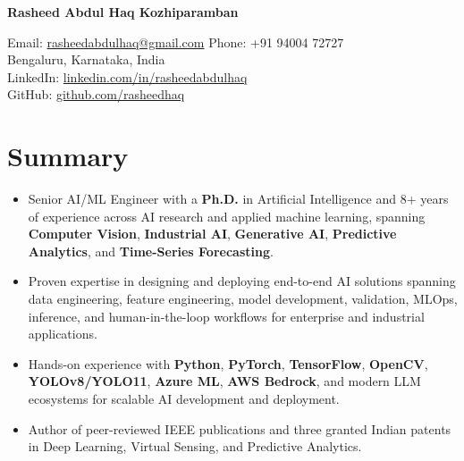 \documentclass[a4paper,10pt]{article}
\begin{document}
	\pagestyle{empty}
	
	\begin{center}
		{\Huge\bfseries Rasheed Abdul Haq Kozhiparamban}
	\end{center}
	
	\vspace{-2ex}
	
	\begin{center}
		Email: \href{mailto:rasheedabdulhaq@gmail.com}{rasheedabdulhaq@gmail.com} \quad Phone: +91 94004 72727 \\
Bengaluru, Karnataka, India \\
LinkedIn: \href{https://www.linkedin.com/in/rasheedabdulhaq}{linkedin.com/in/rasheedabdulhaq} \\
GitHub: \href{https://github.com/rasheedhaq}{github.com/rasheedhaq}
	\end{center}
	



\section{Summary}
\begin{itemize}[left=0pt]
	
	\item Senior AI/ML Engineer with a \textbf{Ph.D.} in Artificial Intelligence and 8+ years of experience across AI research and applied machine learning, spanning \textbf{Computer Vision}, \textbf{Industrial AI}, \textbf{Generative AI}, \textbf{Predictive Analytics}, and \textbf{Time-Series Forecasting}.
	
	\item Proven expertise in designing and deploying end-to-end AI solutions spanning data engineering, feature engineering, model development, validation, MLOps, inference, and human-in-the-loop workflows for enterprise and industrial applications.
	
	\item Hands-on experience with \textbf{Python}, \textbf{PyTorch}, \textbf{TensorFlow}, \textbf{OpenCV}, \textbf{YOLOv8/YOLO11}, \textbf{Azure ML}, \textbf{AWS Bedrock}, and modern LLM ecosystems for scalable AI development and deployment.
	
	\item Author of peer-reviewed IEEE publications and three granted Indian patents in Deep Learning, Virtual Sensing, and Predictive Analytics.
	
\end{itemize}
	
\end{document}
